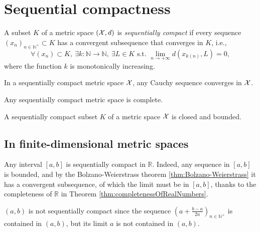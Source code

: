 \section{Sequential compactness}
\label{sec:sequentialCompactness}

\begin{defn}
  \label{def:sequentialCompactness}
  A subset $K$ of a metric space $({\cal X},d)$
  is \emph{sequentially compact}
  if every sequence $(x_n)_{n\in \mathbb{N}^+}\subset K$ has
  a convergent subsequence that converges in $K$, i.e., 
  \begin{equation}
    \label{eq:sequentialCompactness}
    \forall (x_n)\subset K,\
    \exists k: \mathbb{N}\rightarrow \mathbb{N},\ \exists L\in K
    \text{ s.t. }
    \lim_{n\rightarrow +\infty} d(x_{k(n)}, L)=0, 
  \end{equation}
  where the function $k$ is monotonically increasing. 
\end{defn}

\begin{lem}
  \label{lem:CauchySeqInCompactMetric}
  In a sequentially compact metric space ${\cal X}$,   
  any Cauchy sequence converges in ${\cal X}$.
\end{lem}

\begin{coro}
  \label{coro:compactnessImpliesCompleteness}
  Any sequentially compact metric space is complete.
\end{coro}

\begin{lem}
  \label{lem:compactSetsIsClosedAndBounded}
  A sequentially compact subset $K$ of a metric space ${\cal X}$
  is closed and bounded.
\end{lem}

\subsection{In finite-dimensional metric spaces}

\begin{exm}
  Any interval $[a,b]$ is sequentially compact in $\mathbb{R}$.
  Indeed, any sequence in $[a,b]$
  is bounded, and by the Bolzano-Weierstrass theorem
  \ref{thm:Bolzano-Weierstrass}
  it has a convergent subsequence,
  of which the limit must be in $[a,b]$, 
  thanks to the completeness of $\mathbb{R}$
  in Theorem \ref{thm:completenessOfRealNumbers}.
\end{exm}

\begin{exm}
  $(a,b)$ is not sequentially compact
  since the sequence
  $\left(a+\frac{b-a}{2n}\right)_{n\in \mathbb{N}^+}$
  is contained in $(a,b)$,
  but its limit $a$ is not contained in $(a,b)$.
\end{exm}

